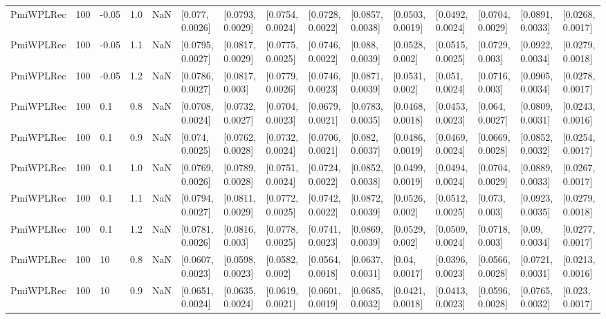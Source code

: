 \begin{tabular}{lllrrllllllllll}
 PmiWPLRec &  100 & -0.05 &   1.0 &   NaN &   [0.077, 0.0026] &  [0.0793, 0.0029] &  [0.0754, 0.0024] &  [0.0728, 0.0022] &  [0.0857, 0.0038] &  [0.0503, 0.0019] &  [0.0492, 0.0024] &  [0.0704, 0.0029] &  [0.0891, 0.0033] &  [0.0268, 0.0017] \\
 PmiWPLRec &  100 & -0.05 &   1.1 &   NaN &  [0.0795, 0.0027] &  [0.0817, 0.0029] &  [0.0775, 0.0025] &  [0.0746, 0.0022] &   [0.088, 0.0039] &   [0.0528, 0.002] &  [0.0515, 0.0025] &   [0.0729, 0.003] &  [0.0922, 0.0034] &  [0.0279, 0.0018] \\
 PmiWPLRec &  100 & -0.05 &   1.2 &   NaN &  [0.0786, 0.0027] &   [0.0817, 0.003] &  [0.0779, 0.0026] &  [0.0746, 0.0023] &  [0.0871, 0.0039] &   [0.0531, 0.002] &   [0.051, 0.0024] &   [0.0716, 0.003] &  [0.0905, 0.0034] &  [0.0278, 0.0017] \\
 PmiWPLRec &  100 &   0.1 &   0.8 &   NaN &  [0.0708, 0.0024] &  [0.0732, 0.0027] &  [0.0704, 0.0023] &  [0.0679, 0.0021] &  [0.0783, 0.0035] &  [0.0468, 0.0018] &  [0.0453, 0.0023] &   [0.064, 0.0027] &  [0.0809, 0.0031] &  [0.0243, 0.0016] \\
 PmiWPLRec &  100 &   0.1 &   0.9 &   NaN &   [0.074, 0.0025] &  [0.0762, 0.0028] &  [0.0732, 0.0024] &  [0.0706, 0.0021] &   [0.082, 0.0037] &  [0.0486, 0.0019] &  [0.0469, 0.0024] &  [0.0669, 0.0028] &  [0.0852, 0.0032] &  [0.0254, 0.0017] \\
 PmiWPLRec &  100 &   0.1 &   1.0 &   NaN &  [0.0769, 0.0026] &  [0.0789, 0.0028] &  [0.0751, 0.0024] &  [0.0724, 0.0022] &  [0.0852, 0.0038] &  [0.0499, 0.0019] &  [0.0494, 0.0024] &  [0.0704, 0.0029] &  [0.0889, 0.0033] &  [0.0267, 0.0017] \\
 PmiWPLRec &  100 &   0.1 &   1.1 &   NaN &  [0.0794, 0.0027] &  [0.0811, 0.0029] &  [0.0772, 0.0025] &  [0.0742, 0.0022] &  [0.0872, 0.0039] &   [0.0526, 0.002] &  [0.0512, 0.0025] &    [0.073, 0.003] &  [0.0923, 0.0035] &  [0.0279, 0.0018] \\
 PmiWPLRec &  100 &   0.1 &   1.2 &   NaN &  [0.0781, 0.0026] &   [0.0816, 0.003] &  [0.0778, 0.0025] &  [0.0741, 0.0023] &  [0.0869, 0.0039] &   [0.0529, 0.002] &  [0.0509, 0.0024] &   [0.0718, 0.003] &    [0.09, 0.0034] &  [0.0277, 0.0017] \\
 PmiWPLRec &  100 &    10 &   0.8 &   NaN &  [0.0607, 0.0023] &  [0.0598, 0.0023] &   [0.0582, 0.002] &  [0.0564, 0.0018] &  [0.0637, 0.0031] &    [0.04, 0.0017] &  [0.0396, 0.0023] &  [0.0566, 0.0028] &  [0.0721, 0.0031] &  [0.0213, 0.0016] \\
 PmiWPLRec &  100 &    10 &   0.9 &   NaN &  [0.0651, 0.0024] &  [0.0635, 0.0024] &  [0.0619, 0.0021] &  [0.0601, 0.0019] &  [0.0685, 0.0032] &  [0.0421, 0.0018] &  [0.0413, 0.0023] &  [0.0596, 0.0028] &  [0.0765, 0.0032] &   [0.023, 0.0017] \\

\end{tabular}
